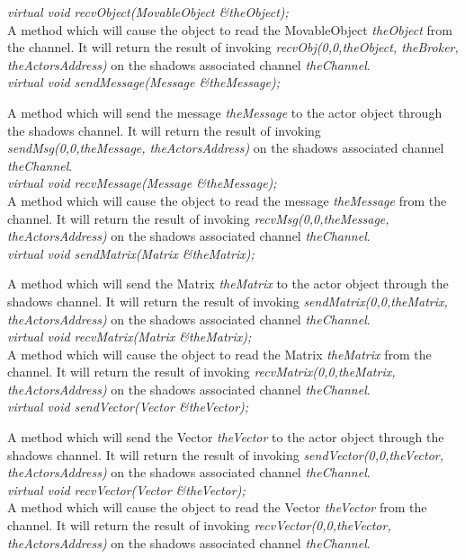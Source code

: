 {\em virtual void recvObject(MovableObject \&theObject);} \\
A method which will cause the object to read the MovableObject {\em
theObject} from the channel. It will return the
result of invoking {\em recvObj(0,0,theObject, theBroker, theActorsAddress)} on the
shadows associated channel {\em theChannel}. \\ 

{\em virtual void sendMessage(Message \&theMessage);}

A method which will send the message {\em theMessage} to
the actor object through the shadows channel. It will return the
result of invoking {\em sendMsg(0,0,theMessage, theActorsAddress)} on the
shadows associated channel {\em theChannel}. \\ 


{\em virtual void recvMessage(Message \&theMessage);} \\
A method which will cause the object to read the message {\em
theMessage} from the channel. It will return the
result of invoking {\em recvMsg(0,0,theMessage, theActorsAddress)} on the
shadows associated channel {\em theChannel}. \\ 


{\em virtual void sendMatrix(Matrix \&theMatrix);}

A method which will send the Matrix {\em theMatrix} to
the actor object through the shadows channel. It will return the
result of invoking {\em sendMatrix(0,0,theMatrix, theActorsAddress)} on the
shadows associated channel {\em theChannel}. \\ 


{\em virtual void recvMatrix(Matrix \&theMatrix);} \\
A method which will cause the object to read the Matrix {\em
theMatrix} from the channel. It will return the
result of invoking {\em recvMatrix(0,0,theMatrix, theActorsAddress)} on the
shadows associated channel {\em theChannel}. \\ 

{\em virtual void sendVector(Vector \&theVector);}

A method which will send the Vector {\em theVector} to
the actor object through the shadows channel. It will return the
result of invoking {\em sendVector(0,0,theVector, theActorsAddress)} on the
shadows associated channel {\em theChannel}. \\ 


{\em virtual void recvVector(Vector \&theVector);} \\
A method which will cause the object to read the Vector {\em
theVector} from the channel. It will return the
result of invoking {\em recvVector(0,0,theVector, theActorsAddress)} on the
shadows associated channel {\em theChannel}. \\ 


